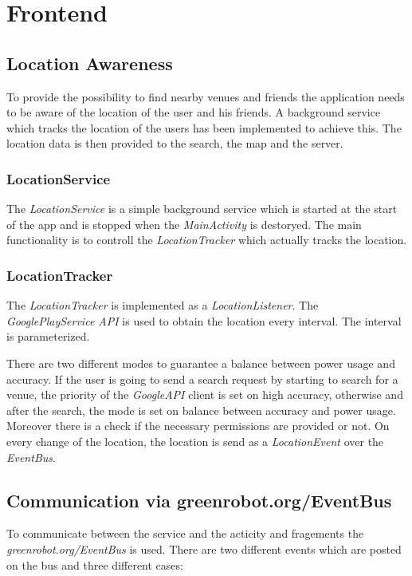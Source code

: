 \section{Frontend}
\label{sec:frontend}

\subsection{Location Awareness}

To provide the possibility to find nearby venues and friends the application needs to be aware of the location of the user and his friends. A background service which tracks the location of the users has been implemented to achieve this. The location data is then provided to the search, the map and the server.

\subsubsection{LocationService}
The \textit{LocationService} is a simple background service which is started at the start of the app and is stopped when the \textit{MainActivity} is destoryed. The main functionality is to controll the \textit{LocationTracker} which actually tracks the location.

\subsubsection{LocationTracker}
The \textit{LocationTracker} is implemented as a \textit{LocationListener}. The \textit{GooglePlayService API} is used to obtain the location every interval. The interval is parameterized.

There are two different modes to guarantee a balance between power usage and accuracy. If the user is going to send a search request by starting to search for a venue, the priority of the \textit{GoogleAPI} client is set on high accuracy, otherwise and after the search, the mode is set on balance between accuracy and power usage. Moreover there is a check if the necessary permissions are provided or not. On every change of the location, the location is send as a \textit{LocationEvent} over the \textit{EventBus}. 

\subsection{Communication via greenrobot.org/EventBus}

To communicate between the service and the acticity and fragements the \textit{greenrobot.org/EventBus} is used. There are two different events which are posted on the bus and three different cases:


